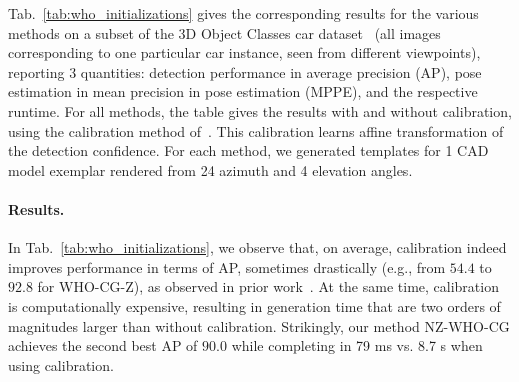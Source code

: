 Tab.~\ref{tab:who_initializations} gives the corresponding results for
the various methods on a subset of the 3D Object Classes car
dataset~\cite{Savarese07} (all images corresponding to one particular
car instance, seen from different viewpoints), reporting 3 quantities:
detection performance in average precision (AP), pose estimation in mean
precision in pose estimation (MPPE), and the respective runtime.
%
For all methods, the table gives the results with and without
calibration, using the calibration method of~\cite{Aubry14}. This
calibration learns affine transformation of the detection confidence.
For each method, we generated templates for 1 CAD model exemplar
rendered from 24 azimuth and 4 elevation angles.

\paragraph{Results.}
In Tab.~\ref{tab:who_initializations}, we observe that, on average,
calibration indeed improves performance in terms of AP, sometimes
drastically (e.g., from $54.4$ to $92.8$ for WHO-CG-Z), as observed in
prior work~\cite{Aubry14}. At the same time, calibration is
computationally expensive, resulting in generation time that are two orders of
magnitudes larger than without calibration. Strikingly, our method
NZ-WHO-CG achieves the second best AP of $90.0$ while completing in 79
ms vs. 8.7 s when using calibration.



